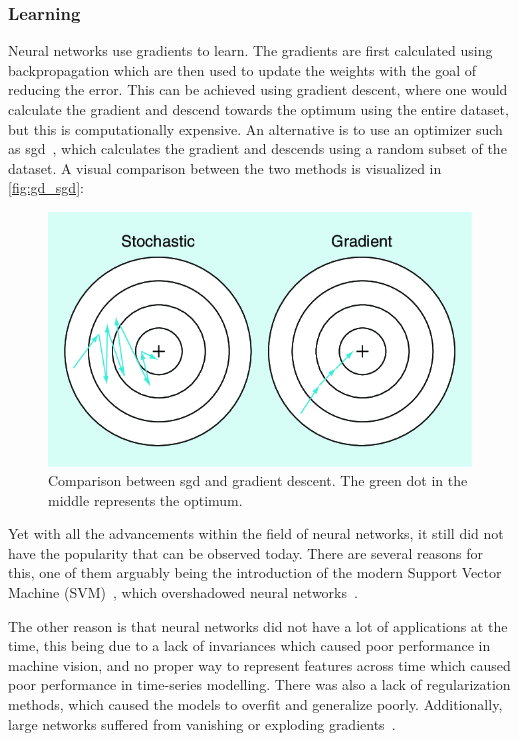 \subsubsection{Learning}
Neural networks use gradients to learn. The gradients are first calculated using backpropagation which are then used to update the weights with the goal of reducing the error. This can be achieved using gradient descent, where one would calculate the gradient and descend towards the optimum using the entire dataset, but this is computationally expensive. An alternative is to use an optimizer such as \gls*{sgd}~\cite{sgd}, which calculates the gradient and descends using a random subset of the dataset. A visual comparison between the two methods is visualized in \autoref{fig:gd_sgd}:
\begin{figure}[htb]
    \centering
    \includegraphics[width=0.7\linewidth]{resources/related_works/gradient_descent}
    \caption[Gradient Descent Comparison]{Comparison between \gls*{sgd} and gradient descent. The green dot in the middle represents the optimum.}
    \label{fig:gd_sgd}
\end{figure}
\par
Yet with all the advancements within the field of neural networks, it still did not have the popularity that can be observed today. There are several reasons for this, one of them arguably being the introduction of the modern Support Vector Machine (SVM)~\cite{svm}, which overshadowed neural networks~\cite{kuncheva2019pattern}.
\par
The other reason is that neural networks did not have a lot of applications at the time, this being due to a lack of invariances which caused poor performance in machine vision, and no proper way to represent features across time which caused poor performance in time-series modelling. There was also a lack of regularization methods, which caused the models to overfit and generalize poorly. Additionally, large networks suffered from vanishing or exploding gradients~\cite{exploding_vanishing_gradients}.
